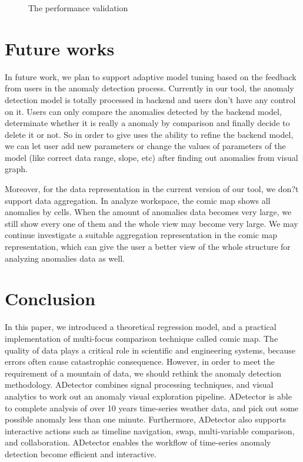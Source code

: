 \documentclass{vgtc}                          %
\begin{document}
\begin{figure}[htb]
\begin{center}
\end{center}
	\caption{The performance validation}
\end{figure} 

\section{Future works}

In future work, we plan to support adaptive model tuning based on the feedback from users in the anomaly detection process. Currently in our tool, the anomaly detection model is totally processed in backend and users don't have any control on it. Users can only compare the anomalies detected by the backend model, determinate whether it is really a anomaly by comparison and finally decide to delete it or not. So in order to give uses the ability to refine the backend model, we can let user add new parameters or change the values of parameters of the model (like correct data range, slope, etc) after finding out anomalies from visual graph.

Moreover, for the data representation in the current version of our tool, we don?t support data aggregation. In analyze workspace, the comic map shows all anomalies by cells. When the amount of anomalies data becomes very large, we still show every one of them and the whole view may become very large. We may continue investigate a suitable aggregation representation in the comic map representation, which can give the user a better view of the whole structure for analyzing anomalies data as well.  
\section{Conclusion}

In this paper, we introduced a theoretical regression model, and a practical implementation of multi-focus comparison technique called comic map. The quality of data plays a critical role in scientific and engineering systems, because errors often cause catastrophic consequence. However, in order to meet the requirement of a mountain of data, we should rethink the anomaly detection methodology. ADetector combines signal processing techniques, and visual analytics to work out an anomaly visual exploration pipeline. ADetector is able to complete analysis of over 10 years time-series weather data, and pick out some possible anomaly less than one minute. Furthermore, ADetector also supports interactive actions such as timeline navigation, swap, multi-variable comparison, and collaboration. ADetector enables the workflow of time-series anomaly detection become efficient and interactive.





\end{document}
